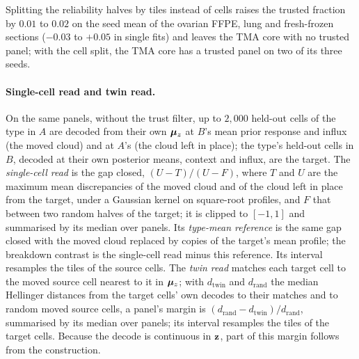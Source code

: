 Splitting the reliability halves by tiles instead of cells raises the trusted fraction by $0.01$ to $0.02$ on the seed mean of the ovarian FFPE, lung and fresh-frozen sections ($-0.03$ to $+0.05$ in single fits) and leaves the TMA core with no trusted panel; with the cell split, the TMA core has a trusted panel on two of its three seeds.

\paragraph{Single-cell read and twin read.} On the same panels, without the trust filter, up to $2{,}000$ held-out cells of the type in $A$ are decoded from their own $\boldsymbol{\mu}_z$ at $B$'s mean prior response and influx (the moved cloud) and at $A$'s (the cloud left in place); the type's held-out cells in $B$, decoded at their own posterior means, context and influx, are the target. The \emph{single-cell read} is the gap closed, $(U - T)/(U - F)$, where $T$ and $U$ are the maximum mean discrepancies \citep{gretton2012} of the moved cloud and of the cloud left in place from the target, under a Gaussian kernel on square-root profiles, and $F$ that between two random halves of the target; it is clipped to $[-1, 1]$ and summarised by its median over panels. Its \emph{type-mean reference} is the same gap closed with the moved cloud replaced by copies of the target's mean profile; the breakdown contrast is the single-cell read minus this reference. Its interval resamples the tiles of the source cells. The \emph{twin read} matches each target cell to the moved source cell nearest to it in $\boldsymbol{\mu}_z$; with $d_{\mathrm{twin}}$ and $d_{\mathrm{rand}}$ the median Hellinger distances from the target cells' own decodes to their matches and to random moved source cells, a panel's margin is $(d_{\mathrm{rand}} - d_{\mathrm{twin}})/d_{\mathrm{rand}}$, summarised by its median over panels; its interval resamples the tiles of the target cells. Because the decode is continuous in $\mathbf{z}$, part of this margin follows from the construction.

